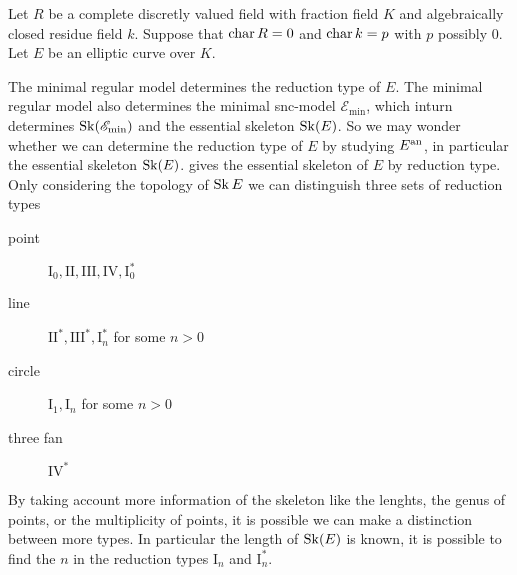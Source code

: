 Let $R$ be a complete discretly valued field with fraction field $K$ and algebraically closed residue field $k$. Suppose that  $\operatorname{char} R = 0$ and $\operatorname{char} k = p$ with $p$ possibly $0$. 
Let $E$ be an elliptic curve over $K$.

The minimal regular model determines the reduction type of $E$. 
The minimal regular model also determines the minimal snc-model $\mathscr E_\text{min} $, which inturn determines $\operatorname{Sk}(\mathscr E_\text{min} )$ and the essential skeleton $\operatorname{Sk}(E)$. 
So we may wonder whether we can determine the reduction type of $E$ by studying $E{}^{\text{an}}$, in particular the essential skeleton $\operatorname{Sk}(E)$.
 gives the essential skeleton of $E$ by reduction type. 
Only considering the topology of $\operatorname{Sk} E$ we can distinguish three sets of reduction types 
\begin{description}
	\item[point] $\mathrm I_0, \mathrm{II}, \mathrm{III},\mathrm{IV}, \mathrm{I}_0^*$ 
	\item[line] $\mathrm{II}^*, \mathrm{III}^*, \mathrm{I}_n^*$ for some $n > 0$
	\item[circle]  $\mathrm{I}_1, \mathrm{I}_n$ for some  $n > 0$
	\item[three fan] $\mathrm {IV}^*$
\end{description}
By taking account more information of the skeleton like the lenghts, the genus of points, or the multiplicity of points, it is possible we can make a distinction between more types.
In particular the length of $\operatorname{Sk}(E)$ is known, it is possible to find the $n$ in the reduction types $\mathrm I_n$ and $\mathrm I_n^*$. 


